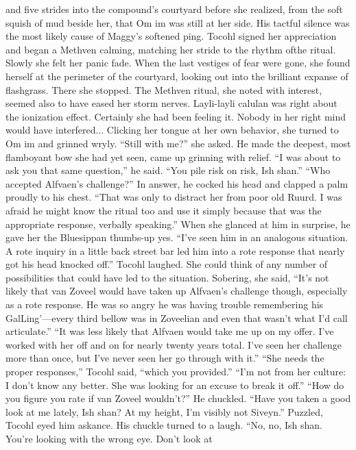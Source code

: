 \documentclass[9pt]{article}
\begin{document}
and five strides into the compound’s courtyard before she realized, from the soft squish of mud beside
her, that Om im was still at her side. His tactful silence was the most likely cause of Maggy’s softened
ping.
Tocohl signed her appreciation and began a Methven calming, matching her stride to the rhythm ofthe ritual. Slowly she felt her panic fade. When the last vestiges of fear were gone, she found herself at
the perimeter of the courtyard, looking out into the brilliant expanse of flashgrass. There she stopped. The
Methven ritual, she noted with interest, seemed also to have eased her storm nerves. Layli-layli calulan
was right about the ionization effect. Certainly she had been feeling it. Nobody in her right mind would
have interfered...
Clicking her tongue at her own behavior, she turned to Om im and grinned wryly. “Still with me?” she
asked.
He made the deepest, most flamboyant bow she had yet seen, came up grinning with relief. “I was
about to ask you that same question,” he said. “You pile risk on risk, Ish shan.”
“Who accepted Alfvaen’s challenge?”
In answer, he cocked his head and clapped a palm proudly to his chest. “That was only to distract
her from poor old Ruurd. I was afraid he might know the ritual too and use it simply because that was the
appropriate response, verbally speaking.”
When she glanced at him in surprise, he gave her the Bluesippan thumbs-up yes. “I’ve seen him in an
analogous situation. A rote inquiry in a little back street bar led him into a rote response that nearly got his
head knocked off.”
Tocohl laughed. She could think of any number of possibilities that could have led to the situation.
Sobering, she said, “It’s not likely that van Zoveel would have taken up Alfvaen’s challenge though,
especially as a rote response. He was so angry he was having trouble remembering his GalLing’—every
third bellow was in Zoveelian and even that wasn’t what I’d call articulate.”
“It was less likely that Alfvaen would take me up on my offer. I’ve worked with her off and on for
nearly twenty years total. I’ve seen her challenge more than once, but I’ve never seen her go through with
it.”
“She needs the proper responses,” Tocohl said, “which you provided.”
“I’m not from her culture: I don’t know any better. She was looking for an excuse to break it off.”
“How do you figure you rate if van Zoveel wouldn’t?”
He chuckled. “Have you taken a good look at me lately, Ish shan? At my height, I’m visibly not
Siveyn.”
Puzzled, Tocohl eyed him askance.
His chuckle turned to a laugh. “No, no, Ish shan. You’re looking with the wrong eye. Don’t look at
\end{document}
